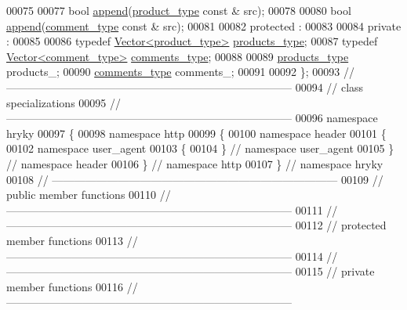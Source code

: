 \begin{DoxyCode}
00075 
00077     \textcolor{keywordtype}{bool} \hyperlink{classhryky_1_1http_1_1header_1_1user__agent_1_1_entity_a6e654ef08c6989219a5bf7ebd5e7ba3b}{append}(\hyperlink{classhryky_1_1http_1_1header_1_1product_1_1_entity}{product_type} \textcolor{keyword}{const} & src);
00078 
00080     \textcolor{keywordtype}{bool} \hyperlink{classhryky_1_1http_1_1header_1_1user__agent_1_1_entity_a6e654ef08c6989219a5bf7ebd5e7ba3b}{append}(\hyperlink{classhryky_1_1http_1_1header_1_1comment_1_1_sequence}{comment_type} \textcolor{keyword}{const} & src);
00081 
00082 \textcolor{keyword}{protected} :
00083 
00084 \textcolor{keyword}{private} :
00085 
00086     \textcolor{keyword}{typedef} \hyperlink{classhryky_1_1_vector}{Vector<product_type>} \hyperlink{classhryky_1_1_vector}{products_type};
00087     \textcolor{keyword}{typedef} \hyperlink{classhryky_1_1_vector}{Vector<comment_type>} \hyperlink{classhryky_1_1_vector}{comments_type};
00088 
00089     \hyperlink{classhryky_1_1_vector}{products_type} products\_;
00090     \hyperlink{classhryky_1_1_vector}{comments_type} comments\_;
00091 
00092 \};
00093 \textcolor{comment}{//
      ------------------------------------------------------------------------------}
00094 \textcolor{comment}{// class specializations}
00095 \textcolor{comment}{//
      ------------------------------------------------------------------------------}
00096 \textcolor{keyword}{namespace }hryky
00097 \{
00098 \textcolor{keyword}{namespace }http
00099 \{
00100 \textcolor{keyword}{namespace }header
00101 \{
00102 \textcolor{keyword}{namespace }user\_agent
00103 \{
00104 \} \textcolor{comment}{// namespace user\_agent}
00105 \} \textcolor{comment}{// namespace header}
00106 \} \textcolor{comment}{// namespace http}
00107 \} \textcolor{comment}{// namespace hryky}
00108 \textcolor{comment}{//
      ------------------------------------------------------------------------------}
00109 \textcolor{comment}{// public member functions}
00110 \textcolor{comment}{//
      ------------------------------------------------------------------------------}
00111 \textcolor{comment}{//
      ------------------------------------------------------------------------------}
00112 \textcolor{comment}{// protected member functions}
00113 \textcolor{comment}{//
      ------------------------------------------------------------------------------}
00114 \textcolor{comment}{//
      ------------------------------------------------------------------------------}
00115 \textcolor{comment}{// private member functions}
00116 \textcolor{comment}{//
      ------------------------------------------------------------------------------}

\end{DoxyCode}
